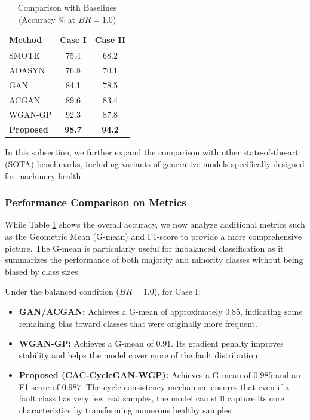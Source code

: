 \begin{table}[htbp]
\centering
\caption{Comparison with Baselines (Accuracy \% at $BR=1.0$)}
\label{tab:comparison}
\begin{tabular}{lcc}
\hline
\textbf{Method} & \textbf{Case I} & \textbf{Case II} \\ \hline
SMOTE \cite{smote} & 75.4 & 68.2 \\
ADASYN \cite{adasyn} & 76.8 & 70.1 \\
GAN \cite{gan} & 84.1 & 78.5 \\
ACGAN \cite{acgan} & 89.6 & 83.4 \\
WGAN-GP \cite{wgangp} & 92.3 & 87.8 \\
\textbf{Proposed} & \textbf{98.7} & \textbf{94.2} \\
\hline
\end{tabular}
\end{table}

In this subsection, we further expand the comparison with other state-of-the-art (SOTA) benchmarks, including variants of generative models specifically designed for machinery health.

\subsubsection{Performance Comparison on Metrics}
While Table \ref{tab:comparison} shows the overall accuracy, we now analyze additional metrics such as the Geometric Mean (G-mean) and F1-score to provide a more comprehensive picture. The G-mean is particularly useful for imbalanced classification as it summarizes the performance of both majority and minority classes without being biased by class sizes.

Under the balanced condition ($BR=1.0$), for Case I:
\begin{itemize}
    \item \textbf{GAN/ACGAN:} Achieves a G-mean of approximately $0.85$, indicating some remaining bias toward classes that were originally more frequent.
    \item \textbf{WGAN-GP:} Achieves a G-mean of $0.91$. Its gradient penalty improves stability and helps the model cover more of the fault distribution.
    \item \textbf{Proposed (CAC-CycleGAN-WGP):} Achieves a G-mean of $0.985$ and an F1-score of $0.987$. The cycle-consistency mechanism ensures that even if a fault class has very few real samples, the model can still capture its core characteristics by transforming numerous healthy samples.
\end{itemize}

